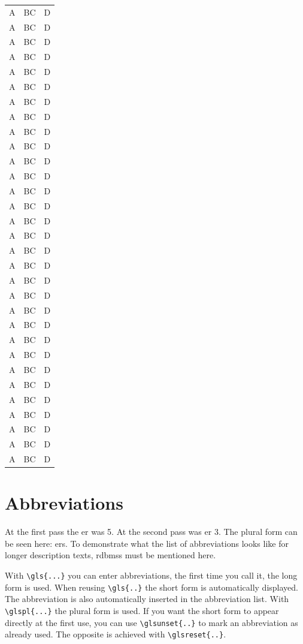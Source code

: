 \begin{longtable}{lll}
A & BC & D \\
A & BC & D \\
A & BC & D \\
A & BC & D \\
A & BC & D \\
A & BC & D \\
A & BC & D \\
A & BC & D \\
A & BC & D \\
A & BC & D \\
A & BC & D \\
A & BC & D \\
A & BC & D \\
A & BC & D \\
A & BC & D \\
A & BC & D \\
A & BC & D \\
A & BC & D \\
A & BC & D \\
A & BC & D \\
A & BC & D \\
A & BC & D \\
A & BC & D \\
A & BC & D \\
A & BC & D \\
A & BC & D \\
A & BC & D \\
A & BC & D \\
A & BC & D \\
A & BC & D \\
A & BC & D \\
\end{longtable}


\section{Abbreviations}
At the first pass the \gls{er} was 5.
At the second pass was \gls{er} 3.
The plural form can be seen here: \glspl{er}.
To demonstrate what the list of abbreviations looks like for longer description texts, \glspl{rdbms} must be mentioned here.

With \verb+\gls{...}+ you can enter abbreviations, the first time you call it, the long form is used.
When reusing \verb+\gls{..}+ the short form is automatically displayed.
The abbreviation is also automatically inserted in the abbreviation list.
With \verb+\glspl{...}+ the plural form is used.
If you want the short form to appear directly at the first use, you can use \verb+\glsunset{..}+ to mark an abbreviation as already used.
The opposite is achieved with \verb+\glsreset{..}+.

